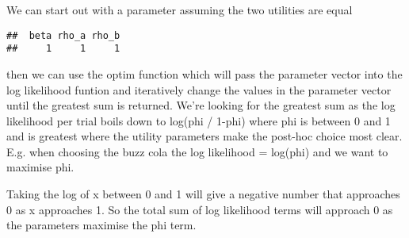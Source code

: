 \documentclass[]{article}
\newenvironment{Shaded}{\begin{snugshade}}{\end{snugshade}}
\newcommand{\KeywordTok}[1]{\textcolor[rgb]{0.13,0.29,0.53}{\textbf{#1}}}
\newcommand{\DataTypeTok}[1]{\textcolor[rgb]{0.13,0.29,0.53}{#1}}
\newcommand{\DecValTok}[1]{\textcolor[rgb]{0.00,0.00,0.81}{#1}}
\newcommand{\StringTok}[1]{\textcolor[rgb]{0.31,0.60,0.02}{#1}}
\newcommand{\OperatorTok}[1]{\textcolor[rgb]{0.81,0.36,0.00}{\textbf{#1}}}
\newcommand{\NormalTok}[1]{#1}
\begin{document}
We can start out with a parameter assuming the two utilities are equal

\begin{Shaded}
\end{Shaded}

\begin{verbatim}
##  beta rho_a rho_b 
##     1     1     1
\end{verbatim}

then we can use the optim function which will pass the parameter vector
into the log likelihood funtion and iteratively change the values in the
parameter vector until the greatest sum is returned. We're looking for
the greatest sum as the log likelihood per trial boils down to log(phi /
1-phi) where phi is between 0 and 1 and is greatest where the utility
parameters make the post-hoc choice most clear. E.g. when choosing the
buzz cola the log likelihood = log(phi) and we want to maximise phi.

Taking the log of x between 0 and 1 will give a negative number that
approaches 0 as x approaches 1. So the total sum of log likelihood terms
will approach 0 as the parameters maximise the phi term.
\end{document}
